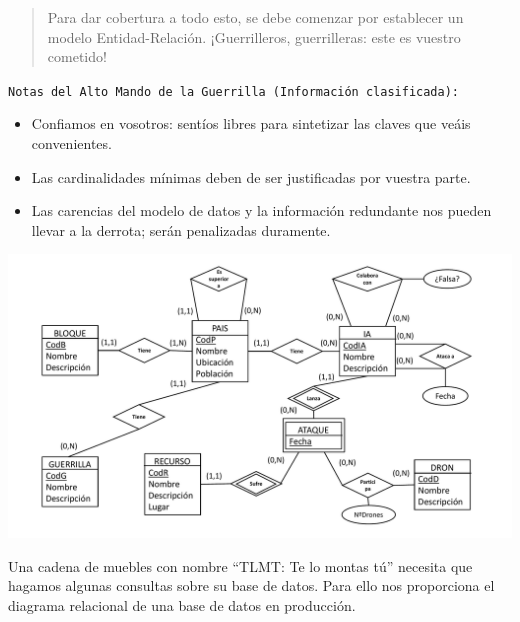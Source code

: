 \documentclass[
    12pt,
    a4paper,
    addpoints,
    answers,
    convocatoria=ord,
    titulacion=NoCD,
    curso=2022/2023,
]{db-exam}
\begin{document}
\begin{questions}
\begin{quotation}
Para dar cobertura a todo esto, se debe comenzar por establecer un modelo Entidad-Relación. ¡Guerrilleros, guerrilleras: este es vuestro cometido!

\end{quotation}
\newpage
\texttt{Notas del Alto Mando de la Guerrilla (Información clasificada):}
\begin{itemize}
    \item Confiamos en vosotros: sentíos libres para sintetizar las claves que veáis convenientes.
    \item Las cardinalidades mínimas deben de ser justificadas por vuestra parte.
    \item Las carencias del modelo de datos y la información redundante nos pueden llevar a la derrota; serán penalizadas duramente.
\end{itemize}

\begin{solution}[20em]
        \includegraphics[width=\textwidth]{figs/bbdd-2022-2023-ordinaria/solucion-mer.pdf}
\end{solution}

\newpage
{}

Una cadena de muebles con nombre ``TLMT: Te lo montas tú'' necesita que hagamos algunas consultas sobre su base de datos. Para ello nos proporciona el diagrama relacional de una base de datos en producción. 
  

\end{questions}
\end{document}
